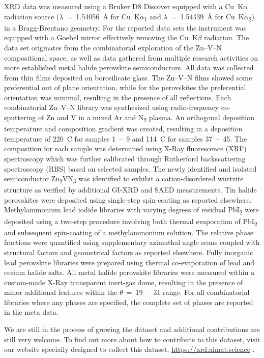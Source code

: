 XRD data was measured using a Bruker D8 Discover equipped with a Cu~K$\alpha$ radiation source ($\lambda$~=~1.54056~{\AA} for Cu~K$\alpha$\textsubscript{1} and $\lambda$~=~1.54439~{\AA} for Cu~K$\alpha$\textsubscript{2}) in a Bragg-Brentano geometry. For the reported data sets the instrument was equipped with a Goebel mirror effectively removing the Cu~K$\beta$ radiation. The data set originates from the combinatorial exploration of the Zn–V–N compositional space, as well as data gathered from multiple research activities on more established metal halide perovskite semiconductors. All data was collected from thin films deposited on borosilicate glass. The Zn–V–N films showed some preferential out of plane orientation, while for the perovskites the preferential orientation was minimal, resulting in the presence of all reflections.
Each combinatorial Zn–V–N library was synthesized using radio-frequency co-sputtering of Zn and V in a mixed Ar and N\textsubscript{2} plasma. An orthogonal deposition temperature and composition gradient was created, resulting in a deposition temperature of 220~{\textdegree}C for samples 1~–~9 and 114~{\textdegree}C for samples 37~–~45. The composition for each sample was determined using X-Ray fluorescence (XRF) spectroscopy which was further calibrated through Rutherford backscattering spectroscopy (RBS) based on selected samples. The newly identified and isolated semiconductor Zn\textsubscript{2}VN\textsubscript{3} was identified to exhibit a cation-disordered wurtzite structure as verified by additional GI-XRD and SAED measurements.\cite{Zhuk2021}
Tin halide perovskites were deposited using single-step spin-coating as reported elsewhere.\cite{Wieczorek2023} Methylammonium lead iodide libraries with varying degrees of residual PbI\textsubscript{2} were deposited using a two-step procedure involving both thermal evaporation of PbI\textsubscript{2} and subsequent spin-coating of a methylammonium solution. The relative phase fractions were quantified using supplementary azimuthal angle scans coupled with structural factors and geometrical factors as reported elsewhere.\cite{Wieczorek2024} Fully inorganic lead perovskite libraries were prepared using thermal co-evaporation of lead and cesium halide salts.
All metal halide perovskite libraries were measured within a custom-made X-Ray transparent inert-gas dome, resulting in the presence of minor additional features within the $\theta$~=~19~–~31{\textdegree} range. For all combinatorial libraries where any phases are specified, the complete set of phases are reported in the meta data.

We are still in the process of growing the dataset and additional contributions are still very welcome. To find out more about how to contribute to this dataset, visit our website specially designed to collect this dataset, \url{https://xrd.aimat.science} .